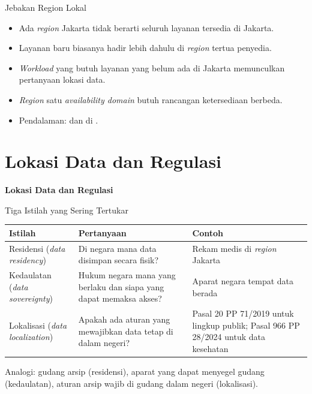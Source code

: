 \documentclass[aspectratio=169, table, 12pt]{beamer}
\begin{document}
\begin{frame}{Jebakan Region Lokal}
  \small
  \begin{itemize}
    \item Ada \textit{region} Jakarta tidak berarti seluruh layanan tersedia di Jakarta.
    \item Layanan baru biasanya hadir lebih dahulu di \textit{region} tertua penyedia.
    \item \textit{Workload} yang butuh layanan yang belum ada di Jakarta memunculkan
          pertanyaan lokasi data.
    \item \textit{Region} satu \textit{availability domain} butuh rancangan ketersediaan
          berbeda.
    \item Pendalaman:  dan 
          di .
  \end{itemize}
\end{frame}

\section{Lokasi Data dan Regulasi}

\begin{frame}{\hfill}
  \centering
  \Huge{\textbf{Lokasi Data dan Regulasi}}
\end{frame}

\begin{frame}{Tiga Istilah yang Sering Tertukar}
  \footnotesize
  \begin{tabularx}{\textwidth}{>{\raggedright\arraybackslash}p{3.8cm}
      >{\raggedright\arraybackslash}X >{\raggedright\arraybackslash}X}
    \hline
    \textbf{Istilah} & \textbf{Pertanyaan} & \textbf{Contoh} \\
    \hline
    Residensi (\textit{data residency}) & Di negara mana data disimpan secara fisik? &
      Rekam medis di \textit{region} Jakarta \\
    \hline
    Kedaulatan (\textit{data sovereignty}) & Hukum negara mana yang berlaku dan siapa yang
      dapat memaksa akses? & Aparat negara tempat data berada \\
    \hline
    Lokalisasi (\textit{data localization}) & Apakah ada aturan yang mewajibkan data tetap di
      dalam negeri? & Pasal 20 PP 71/2019 untuk lingkup publik; Pasal 966 PP 28/2024 untuk data kesehatan \\
    \hline
  \end{tabularx}

  \vspace{8pt}
  \small Analogi: gudang arsip (residensi), aparat yang dapat menyegel gudang
  (kedaulatan), aturan arsip wajib di gudang dalam negeri (lokalisasi).
\end{frame}
\end{document}
